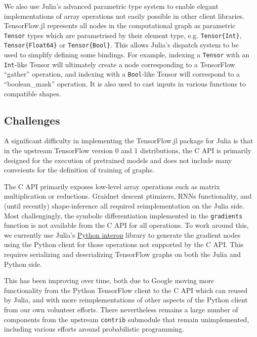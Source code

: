 \documentclass{book}
\begin{document}
We also use Julia's advanced parametric type system to enable elegant
implementations of array operations not easily possible in other client
libraries. TensorFlow.jl represents all nodes in the computational graph
as parametric \texttt{Tensor} types which are parametrised by their
element type, e.g. \texttt{Tensor\{Int\}}, \texttt{Tensor\{Float64\}} or
\texttt{Tensor\{Bool\}}. This allows Julia's dispatch system to be used
to simplify defining some bindings. For example, indexing a
\texttt{Tensor} with an \texttt{Int}-like Tensor will ultimately create
a node corresponding to a TensorFlow ``gather'' operation, and indexing
with a \texttt{Bool}-like Tensor will correspond to a ``boolean\_mask''
operation. It is also used to cast inputs in various functions to
compatible shapes.
\hypertarget{challenges}{%
	\subsection{Challenges}\label{challenges}}

A significant difficulty in implementing the TensorFlow.jl package for
Julia is that in the upstream TensorFlow version 0 and 1 distributions,
the C API is primarily designed for the execution of pretrained models
and does not include many conveients for the definition of training of
graphs.

The C API primarily exposes low-level array operations such as matrix
multiplication or reductions. Graidnet descent ptimizers, RNNs
functionality, and (until recently) shape-inference all required
reimplementation on the Julia side. Most challengingly, the symbolic
differentiation implemented in the \texttt{gradients} function is not
available from the C API for all operations. To work around this, we
currently use Julia's \href{https://github.com/JuliaPy/PyCall.jl}{Python
	interop} library to generate the gradient nodes using the Python client
for those operations not supported by the C API. This requires
serializing and deserializing TensorFlow graphs on both the Julia and
Python side.

This has been improving over time, both due to Google moving more
functionality from the Python TensorFlow client to the C API which can
reused by Julia, and with more reimplementations of other aspects of the
Python client from our own volunteer efforts. There nevertheless remains
a large number of components from the upstream \texttt{contrib}
submodule that remain unimplemented, including various efforts around
probabilistic programming.
\end{document}

